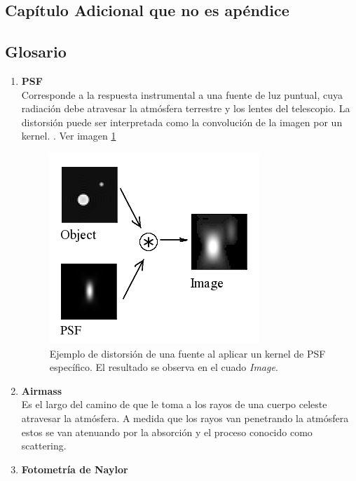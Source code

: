 \begin{additional} 
\section{Capítulo Adicional que no es apéndice}
\end{additional}

\begin{appendix} 
\section{Glosario}

\begin{enumerate}
\item{\textbf{PSF}}\\
\label{a1:psf}
Corresponde a la respuesta instrumental a una fuente de luz puntual, cuya radiaci\'on debe atravesar la atm\'osfera terrestre y los lentes del telescopio. La distorsi\'on puede ser interpretada como la convoluci\'on de la imagen por un kernel. \cite{huentelemu}. Ver imagen \ref{fig:a1}

\begin{figure}[h]
\centering
\includegraphics[scale=.5]{images/psf}
\caption{Ejemplo de distorsi\'on de una fuente al aplicar un kernel de PSF espec\'ifico. El resultado se observa en el cuado \textit{Image}.}
\label{fig:a1}
\end{figure}

\item{\textbf{Airmass}}\label{ap:airmass}\\
Es el largo del camino de que le toma a los rayos de una cuerpo celeste atravesar la atm\'osfera. A medida que los rayos van penetrando la atm\'osfera estos se van atenuando por la absorci\'on y el proceso conocido como scattering. 
\item{\textbf{Fotometr\'ia de Naylor}}\\
\end{enumerate}

\end{appendix}
